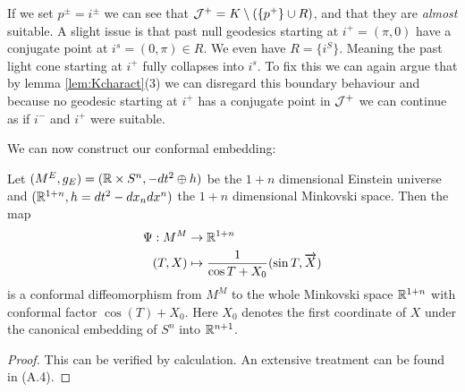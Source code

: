 If we set $p^\pm = i^\pm$ we can see that ${\mathcal{J}}^+ = K \setminus (\{p^+\} \cup R)$, and that they are \emph{almost} suitable. A slight issue is that past null geodesics starting at $i^+=(\pi, 0)$ have a conjugate point at $i^s=(0,\pi)\in R$. We even have $R = \{i^S\}$. Meaning the past light cone starting at $i^+$ fully collapses into $i^s$. To fix this we can again argue that by lemma \ref{lem:Kcharact}(3) we can disregard this boundary behaviour and because no geodesic starting at $i^+$ has a conjugate point in ${\mathcal{J}}^+$ we can continue as if $i^-$ and $i^+$ were suitable.

We can now construct our conformal embedding:
\begin{proposition}
Let $(M^E,g_E)=(\mathbb{R}\times S^n,-dt^2 \oplus h)$ be the $1+n$ dimensional Einstein universe and $(\mathbb{R}^{1+n},h=dt^2-dx_ndx^n)$ the $1+n$ dimensional Minkovski space. Then the map 
\begin{align}
    \Psi:M^M &\to \mathbb{R}^{1+n}\\
    (T,X) &\mapsto\frac{1}{\cos T + X_0}(\sin T,\overrightarrow{X})
\end{align}
is a conformal diffeomorphism from $M^M$ to the whole Minkovski space $\mathbb{R}^{1+n}$ with conformal factor $\cos(T)+X_0$. Here $X_0$ denotes the first coordinate of $X$ under the canonical embedding of $S^n$ into $\mathbb{R}^{n+1}$.
\end{proposition}
\begin{proof}
    This can be verified by calculation. An extensive treatment can be found in \cite{hormander}(A.4).
\end{proof}

